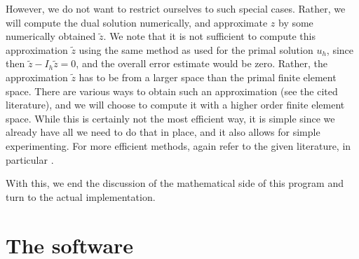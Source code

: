 \documentclass{article}
\begin{document}
However, we do not want to restrict ourselves to such special cases. Rather,
we will compute the dual solution numerically, and approximate $z$ by some
numerically obtained $\tilde z$. We note that it is not sufficient to compute
this approximation $\tilde z$ using the same method as used for the primal
solution $u_h$, since then $\tilde z-I_h \tilde z=0$, and the overall error
estimate would be zero. Rather, the approximation $\tilde z$ has to be from a
larger space than the primal finite element space. There are various ways to
obtain such an approximation (see the cited literature), and we will choose to
compute it with a higher order finite element space. While this is certainly
not the most efficient way, it is simple since we already have all we need to
do that in place, and it also allows for simple experimenting. For more
efficient methods, again refer to the given literature, in particular
\cite{BR95,BR96r,BR01}.

With this, we end the discussion of the mathematical side of this program and
turn to the actual implementation.


\section{The software}




\end{document}
